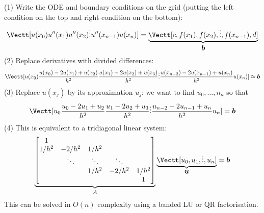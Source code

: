 (1) Write the ODE and boundary conditions on the grid (putting the left condition on the top and right condition on the bottom):
\[
\Vectt[u(x_0) \\ 
u''(x_1) \\
u''(x_2) \\
\ensuremath{\vdots} \\
u''(x_{n-1}) \\
u(x_n)] = \underbrace{\Vectt[c, f(x_1), f(x_2), \ensuremath{\vdots} , f(x_{n-1}), d]}_{\ensuremath{\bm{\b}}}
\]
(2) Replace derivatives with divided differences:
\[
\Vectt[u(x_0) \\ 
{u(x_0) - 2u(x_1) + u(x_2)\over h^2} \\
{u(x_1) - 2u(x_2) + u(x_3)\over h^2} \\
\ensuremath{\vdots} \\
{u(x_{n-2}) - 2u(x_{n-1}) + u(x_n)\over h^2} \\
u(x_n)] \ensuremath{\approx} \ensuremath{\bm{\b}}
\]
(3) Replace $u(x_j)$  by its approximation $u_j$: we want to find $u_0,\ensuremath{\ldots},n_n$ so that
\[
\Vectt[u_0 \\ 
{u_0 - 2u_1 + u_2\over h^2} \\
{u_1 - 2u_2 + u_3\over h^2} \\
\ensuremath{\vdots} \\
{u_{n-2} - 2u_{n-1} + u_n\over h^2} \\
u_n] = \ensuremath{\bm{\b}}
\]
(4) This is equivalent to a tridiagonal linear system:
\[
\underbrace{\begin{bmatrix}
    1 \\ 
    1/h^2 & -2/h^2 & 1/h^2 \\
    & \ensuremath{\ddots} & \ensuremath{\ddots} & \ensuremath{\ddots} \\
   && 1/h^2 & -2/h^2 & 1/h^2 \\ 
   &&&& 1 \end{bmatrix}}_A \underbrace{\Vectt[u_0,u_1,\ensuremath{\vdots},u_n]}_{\ensuremath{\bm{\u}}} = \ensuremath{\bm{\b}}
\]
This can be solved in $O(n)$ complexity using a banded LU or QR factorisation.



